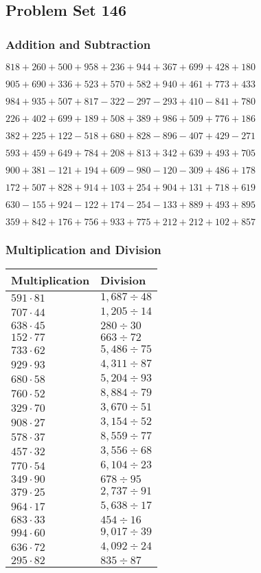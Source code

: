 \hypertarget{problem-set-146}{%
\subsection{Problem Set 146}\label{problem-set-146}}

\hypertarget{addition-and-subtraction}{%
\subsubsection{Addition and
Subtraction}\label{addition-and-subtraction}}

\(818 +260 +500 +958 +236 +944 +367 +699 +428 +180\)

\(905 +690 +336 +523 +570 +582 +940 +461 +773 +433\)

\(984 +935 +507 +817 - 322 - 297 - 293 +410 - 841 +780\)

\(226 +402 +699 +189 +508 +389 +986 +509 +776 +186\)

\(382 +225 +122 - 518 +680 +828 - 896 - 407 +429 - 271\)

\(593 +459 +649 +784 +208 +813 +342 +639 +493 +705\)

\(900 +381 - 121 +194 +609 - 980 - 120 - 309 +486 +178\)

\(172 +507 +828 +914 +103 +254 +904 +131 +718 +619\)

\(630 - 155 +924 - 122 +174 - 254 - 133 +889 +493 +895\)

\(359 +842 +176 +756 +933 +775 +212 +212 +102 +857\)

\hypertarget{multiplication-and-division}{%
\subsubsection{Multiplication and
Division}\label{multiplication-and-division}}

\begin{longtable}[]{@{}ll@{}}
\toprule
Multiplication & Division\tabularnewline
\midrule
\endhead
\(591 \cdot 81\) & \(1,687÷48\)\tabularnewline
\(707 \cdot 44\) & \(1,205÷14\)\tabularnewline
\(638 \cdot 45\) & \(280÷30\)\tabularnewline
\(152 \cdot 77\) & \(663÷72\)\tabularnewline
\(733 \cdot 62\) & \(5,486÷75\)\tabularnewline
\(929 \cdot 93\) & \(4,311÷87\)\tabularnewline
\(680 \cdot 58\) & \(5,204÷93\)\tabularnewline
\(760 \cdot 52\) & \(8,884÷79\)\tabularnewline
\(329 \cdot 70\) & \(3,670÷51\)\tabularnewline
\(908 \cdot 27\) & \(3,154÷52\)\tabularnewline
\(578 \cdot 37\) & \(8,559÷77\)\tabularnewline
\(457 \cdot 32\) & \(3,556÷68\)\tabularnewline
\(770 \cdot 54\) & \(6,104÷23\)\tabularnewline
\(349 \cdot 90\) & \(678÷95\)\tabularnewline
\(379 \cdot 25\) & \(2,737÷91\)\tabularnewline
\(964 \cdot 17\) & \(5,638÷17\)\tabularnewline
\(683 \cdot 33\) & \(454÷16\)\tabularnewline
\(994 \cdot 60\) & \(9,017÷39\)\tabularnewline
\(636 \cdot 72\) & \(4,092÷24\)\tabularnewline
\(295 \cdot 82\) & \(835÷87\)\tabularnewline
\bottomrule
\end{longtable}
